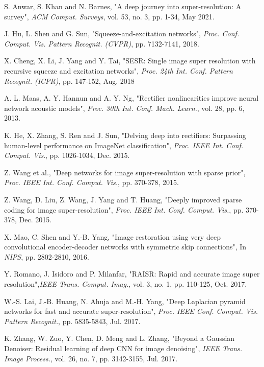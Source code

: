 \documentclass{ieeeaccess}
\begin{document}
\begin{thebibliography}{00}
 S. Anwar, S. Khan and N. Barnes, "A deep journey into super-resolution: A survey", \textit{ACM Comput. Surveys}, vol. 53, no. 3, pp. 1-34, May 2021.


 J. Hu, L. Shen and G. Sun, "Squeeze-and-excitation networks", \textit{Proc. Conf. Comput. Vis. Pattern Recognit. (CVPR)}, pp. 7132-7141, 2018.


 X. Cheng, X. Li, J. Yang and Y. Tai, "SESR: Single image super resolution with recursive squeeze and excitation networks", \textit{Proc. 24th Int. Conf. Pattern Recognit. (ICPR)}, pp. 147-152, Aug. 2018


 A. L. Maas, A. Y. Hannun and A. Y. Ng, "Rectifier nonlinearities improve neural network acoustic models", \textit{Proc. 30th Int. Conf. Mach. Learn.}, vol. 28, pp. 6, 2013.


 K. He, X. Zhang, S. Ren and J. Sun, "Delving deep into rectifiers: Surpassing human-level performance on ImageNet classification", \textit{Proc. IEEE Int. Conf. Comput. Vis}., pp. 1026-1034, Dec. 2015.



 Z. Wang et al., "Deep networks for image super-resolution with sparse prior", \textit{Proc. IEEE Int. Conf. Comput. Vis.}, pp. 370-378, 2015.


 Z. Wang, D. Liu, Z. Wang, J. Yang and T. Huang, "Deeply improved sparse coding for image super-resolution", \textit{Proc. IEEE Int. Conf. Comput. Vis.}, pp. 370-378, Dec. 2015.


 X. Mao, C. Shen and Y.-B. Yang, "Image restoration using very deep convolutional encoder-decoder networks with symmetric skip connections", In \textit{NIPS}, pp. 2802-2810, 2016.



 Y. Romano, J. Isidoro and P. Milanfar, "RAISR: Rapid and accurate image super resolution",\textit{IEEE Trans. Comput. Imag.}, vol. 3, no. 1, pp. 110-125, Oct. 2017.


 W.-S. Lai, J.-B. Huang, N. Ahuja and M.-H. Yang, "Deep Laplacian pyramid networks for fast and accurate super-resolution", \textit{Proc. IEEE Conf. Comput. Vis. Pattern Recognit.}, pp. 5835-5843, Jul. 2017.


 K. Zhang, W. Zuo, Y. Chen, D. Meng and L. Zhang, "Beyond a Gaussian Denoiser: Residual learning of deep CNN for image denoising", \textit{IEEE Trans. Image Process.}, vol. 26, no. 7, pp. 3142-3155, Jul. 2017.



\end{thebibliography}
\end{document}
